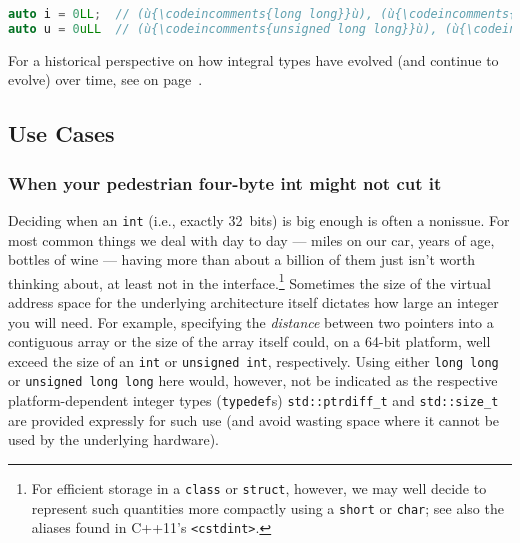 \begin{lstlisting}[language=C++]
auto i = 0LL;  // (ù{\codeincomments{long long}}ù), (ù{\codeincomments{sizeof(i) * CHAR\_BIT >= 64}}ù)
auto u = 0uLL  // (ù{\codeincomments{unsigned long long}}ù), (ù{\codeincomments{sizeof(u) * CHAR\_BIT >= 64}}ù)
\end{lstlisting}

\noindent For a historical perspective on how integral types have evolved (and
continue to evolve) over time, see {\it{}} on page~\pageref{historical-perspective-on-the-evolution-of-use-of-fundamental-integral-types}.

\subsection[Use Cases]{Use Cases}\label{use-cases}

\subsubsection[When your pedestrian four-byte {\tt int} might not cut it]{When your pedestrian four-byte {\SubsubsecCode int} might not cut it}\label{when-your-pedestrian-four-byte-int-might-not-cut-it}

Deciding when an \texttt{int} (i.e., exactly 32~bits) is big enough is
often a nonissue. For most common things we deal with day to day ---
miles on our car, years of age, bottles of wine --- having more than about a
billion of them just isn't worth thinking about, at least not in the
interface.{\cprotect\footnote{For efficient storage in a \texttt{class}
or \texttt{struct}, however, we may well decide to represent such
quantities more compactly using a \texttt{short} or \texttt{char}; see
also the aliases found in C++11's \texttt{<cstdint>}.}} Sometimes the size of the virtual address space for the
underlying architecture itself dictates how large an integer you will
need. For example, specifying the \emph{distance} between two pointers
into a contiguous array or the size of the array itself could, on a
64-bit platform, well exceed the size of an \texttt{int} or
\texttt{unsigned}~\texttt{int}, respectively. Using either
\texttt{long}~\texttt{long} or
\texttt{unsigned}~\texttt{long}~\texttt{long} here would, however, not
be indicated as the respective platform-dependent integer types
(\texttt{typedef}s) \texttt{std::ptrdiff\_t} and \texttt{std::size\_t}
are provided expressly for such use (and avoid wasting space where it
cannot be used by the underlying hardware).

